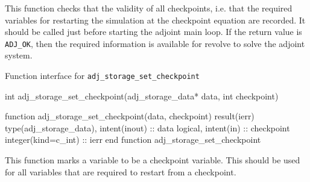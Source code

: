 This function checks that the validity of all checkpoints, i.e. that the required variables for restarting the simulation at the checkpoint equation are recorded.
It should be called just before starting the adjoint main loop.
If the return value is \texttt{ADJ_OK}, then the required information is available for revolve to solve the adjoint system.


\begin{boxwithtitle}{Function interface for \texttt{adj_storage_set_checkpoint}}
\begin{minipage}{\columnwidth}
\begin{ccode}
int adj_storage_set_checkpoint(adj_storage_data* data, int checkpoint)
\end{ccode}
\begin{fortrancode}
function adj_storage_set_checkpoint(data, checkpoint) result(ierr)
  type(adj_storage_data), intent(inout) :: data
  logical, intent(in) :: checkpoint
  integer(kind=c_int) :: ierr
end function adj_storage_set_checkpoint
\end{fortrancode}
\end{minipage}
\end{boxwithtitle}

This function marks a variable to be a checkpoint variable. This should be used for all variables that are required to restart from a checkpoint.
